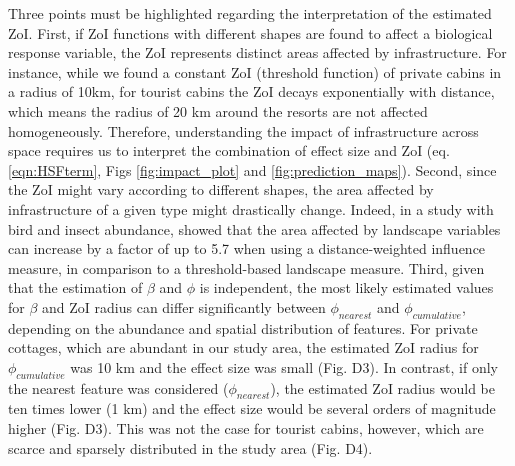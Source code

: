 \documentclass[titlepage]{article}
\begin{document}
Three points must be highlighted regarding the interpretation of the estimated ZoI.
First, if ZoI functions with different shapes are found to affect a biological response variable, the ZoI represents distinct areas affected by infrastructure. For instance, while we found a constant ZoI (threshold function) of private cabins in a radius of 10km, for tourist cabins the ZoI decays exponentially with distance, which means the radius of 20 km around the resorts are not affected homogeneously. Therefore, understanding the impact of infrastructure across space requires us to interpret the combination of effect size and ZoI (eq. \ref{eqn:HSFterm}, Figs \ref{fig:impact_plot} and \ref{fig:prediction_maps}). Second, since the ZoI might vary according to different shapes, the area affected by infrastructure of a given type might drastically change. Indeed, in a study with bird and insect abundance, \citet{miguet_how_2017} showed that the area affected by landscape variables can increase by a factor of up to 5.7 when using a distance-weighted influence measure, in comparison to a threshold-based landscape measure. Third, given that the estimation of $\beta$ and $\phi$ is independent, the most likely estimated values for $\beta$ and ZoI radius can differ significantly between $\phi_{nearest}$ and $\phi_{cumulative}$, depending on the abundance and spatial distribution of features. For private cottages, which are abundant in our study area, the estimated ZoI radius for $\phi_{cumulative}$ was 10 km and the effect size was small (Fig. D3). In contrast, if only the nearest feature was considered ($\phi_{nearest}$), the estimated ZoI radius would be ten times lower (1 km) and the effect size would be several orders of magnitude higher (Fig. D3). This was not the case for tourist cabins, however, which are scarce and sparsely distributed in the study area (Fig. D4).
\end{document}
